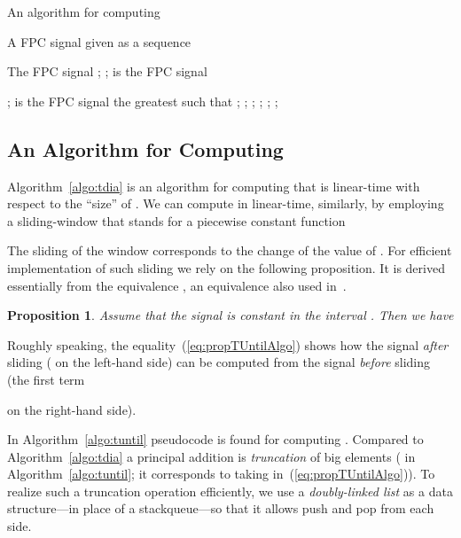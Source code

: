 \documentclass[envcountsect,orivec]{llncs} \usepackage{etex} \usepackage[]{graphicx}
\newtheorem{myproposition}[mytheorem]{Proposition}
\begin{document}
\begin{algorithm}
  \caption{An algorithm for computing }
  \label{algo:dia}
    \begin{algorithmic}
      \Require A FPC signal  given as a sequence 
       
      \Ensure The FPC signal 
      \State ; 
      \State ; 
      \Comment  is the FPC signal 
      
\State 
      ; 
      \Comment  is the FPC signal 
      \While{}
      \State  the greatest  such that 
      ;
      \State ; 
      \State ; 
      \State ;
      \State ;
      \State ;
      \EndWhile
    \end{algorithmic}
\end{algorithm}

\subsection{An Algorithm for Computing  }
\label{appendix:algoTUntil}

 Algorithm~\ref{algo:tdia}
is an algorithm for computing 
that is linear-time
with respect to the ``size'' of .
We can compute 
in linear-time, similarly,
by employing a sliding-window 
that stands for a piecewise constant function

The sliding of the window corresponds to the change of the value of .
For efficient implementation of such sliding we rely on the following
proposition. It is derived essentially from 
the equivalence , an equivalence also used  in~\cite{DBLP:conf/cav/DonzeFM13}.
\begin{myproposition}\label{prop:TUntilAlgo}
Assume
that the signal
  is constant
 in the interval . Then we have

\end{myproposition}
\begin{myproof}
  
\end{myproof}

Roughly speaking, the equality~(\ref{eq:propTUntilAlgo}) shows how the
signal \emph{after} sliding ( on the left-hand side) can be computed from
the signal \emph{before} sliding (the first term 

on the right-hand side). 

In Algorithm~\ref{algo:tuntil} pseudocode is found for 
computing 
. Compared to
Algorithm~\ref{algo:tdia} a principal addition is \emph{truncation} of
big elements ( in Algorithm~\ref{algo:tuntil}; it
corresponds
to taking  in~(\ref{eq:propTUntilAlgo})). To realize such a
truncation operation
efficiently, we use a \emph{doubly-linked list} as a data
structure---in place of a stackqueue---so that it allows push and pop
from each side.
\end{document}
